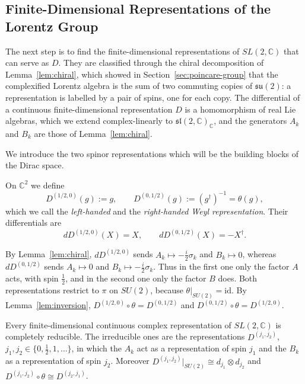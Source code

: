 	\subsection*{Finite-Dimensional Representations of the Lorentz Group}
	
	The next step is to find the finite-dimensional representations of $SL(2,\mathbb{C})$ that can serve as $D$. They are classified through the chiral decomposition of Lemma~\ref{lem:chiral}, which showed in Section~\ref{sec:poincare-group} that the complexified Lorentz algebra is the sum of two commuting copies of $\mathfrak{su}(2)$: a representation is labelled by a pair of spins, one for each copy. The differential of a continuous finite-dimensional representation $D$ is a homomorphism of real Lie algebras, which we extend complex-linearly to $\mathfrak{sl}(2,\mathbb{C})_{\mathbb{C}}$, and the generators $A_k$ and $B_k$ are those of Lemma~\ref{lem:chiral}.
	
	We introduce the two spinor representations which will be the building blocks of the Dirac space.
	
	\begin{definition}\label{def:weyl-spinors}
		On $\mathbb{C}^2$ we define
		\begin{equation*}
			D^{(1/2,0)}(g):=g, \qquad D^{(0,1/2)}(g):=(g^\dagger)^{-1}=\theta(g),
		\end{equation*}
		which we call the \emph{left-handed} and the \emph{right-handed Weyl representation}. Their differentials are
		\begin{equation*}
			dD^{(1/2,0)}(X)=X, \qquad dD^{(0,1/2)}(X)=-X^\dagger.
		\end{equation*}
	\end{definition}
	
	\noindent By Lemma~\ref{lem:chiral}, $dD^{(1/2,0)}$ sends $A_k\mapsto-\tfrac{i}{2}\sigma_k$ and $B_k\mapsto0$, whereas $dD^{(0,1/2)}$ sends $A_k\mapsto0$ and $B_k\mapsto-\tfrac{i}{2}\sigma_k$. Thus in the first one only the factor $A$ acts, with spin $\frac12$, and in the second one only the factor $B$ does. Both representations restrict to $\pi$ on $SU(2)$, because $\theta|_{SU(2)}=\mathrm{id}$. By Lemma~\ref{lem:inversion}, $D^{(1/2,0)}\circ\theta=D^{(0,1/2)}$ and $D^{(0,1/2)}\circ\theta=D^{(1/2,0)}$.
	
	\begin{theorem}\label{thm:finite-reps}
		Every finite-dimensional continuous complex representation of $SL(2,\mathbb{C})$ is completely reducible. The irreducible ones are the representations $D^{(j_1,j_2)}$, $j_1,j_2\in\{0,\frac12,1,\dots\}$, in which the $A_k$ act as a representation of spin $j_1$ and the $B_k$ as a representation of spin $j_2$. Moreover $D^{(j_1,j_2)}|_{SU(2)}\cong d_{j_1}\otimes d_{j_2}$ and $D^{(j_1,j_2)}\circ\theta\cong D^{(j_2,j_1)}$.
	\end{theorem}
	
